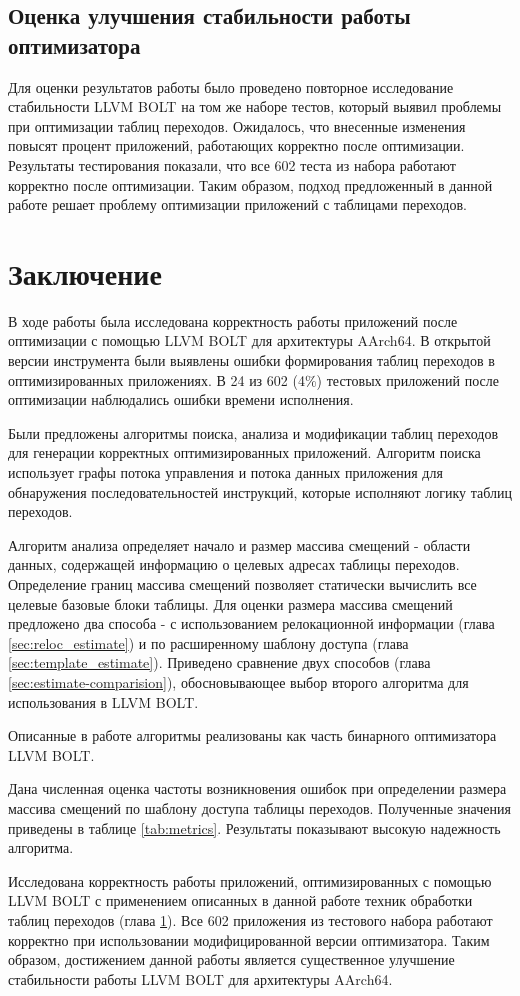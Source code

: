 \documentclass{mipt-thesis-bs}
\begin{document}
    \section{Оценка улучшения стабильности работы оптимизатора} \label{sec:results}
    Для оценки результатов работы было проведено повторное исследование стабильности LLVM BOLT на том же наборе тестов, который выявил проблемы при оптимизации таблиц переходов. Ожидалось, что внесенные изменения повысят процент приложений, работающих корректно после оптимизации. Результаты тестирования показали, что все 602 теста из набора работают корректно после оптимизации. Таким образом, подход предложенный в данной работе решает проблему оптимизации приложений с таблицами переходов.

    \chapter{Заключение}
    В ходе работы была исследована корректность работы приложений после оптимизации с помощью LLVM BOLT для архитектуры AArch64. В открытой версии инструмента были выявлены ошибки формирования таблиц переходов в оптимизированных приложениях. В 24 из 602 (4\%) тестовых приложений после оптимизации наблюдались ошибки времени исполнения.

    Были предложены алгоритмы поиска, анализа и модификации таблиц переходов для генерации корректных оптимизированных приложений. Алгоритм поиска использует графы потока управления и потока данных приложения для обнаружения последовательностей инструкций, которые исполняют логику таблиц переходов.

    Алгоритм анализа определяет начало и размер массива смещений - области данных, содержащей информацию о целевых адресах таблицы переходов. Определение границ массива смещений позволяет статически вычислить все целевые базовые блоки таблицы. Для оценки размера массива смещений предложено два способа - с использованием релокационной информации (глава \ref{sec:reloc_estimate}) и по расширенному шаблону доступа (глава \ref{sec:template_estimate}). Приведено сравнение двух способов (глава \ref{sec:estimate-comparision}), обосновывающее выбор второго алгоритма для использования в LLVM BOLT.

    Описанные в работе алгоритмы реализованы как часть бинарного оптимизатора LLVM BOLT.

    Дана численная оценка частоты возникновения ошибок при определении размера массива смещений по шаблону доступа таблицы переходов. Полученные значения приведены в таблице \ref{tab:metrics}. Результаты показывают высокую надежность алгоритма.

    Исследована корректность работы приложений, оптимизированных с помощью LLVM BOLT с применением описанных в данной работе техник обработки таблиц переходов (глава \ref{sec:results}). Все 602 приложения из тестового набора работают корректно при использовании модифицированной версии оптимизатора. Таким образом, достижением данной работы является существенное улучшение стабильности работы LLVM BOLT для архитектуры AArch64.

    \backmatter

    \printbib
\end{document}
